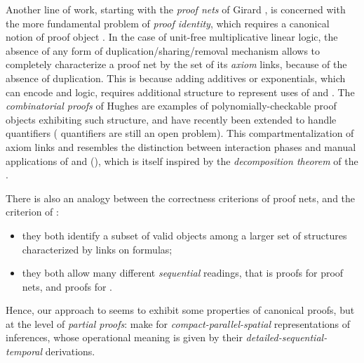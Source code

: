 \begin{scope}
Another line of work, starting with the \emph{proof nets} of Girard
, is concerned with the more fundamental problem of
\emph{proof identity}, which requires a canonical notion of proof object
. In the case of unit-free multiplicative
linear logic, the absence of any form of duplication/sharing/removal mechanism
allows to completely characterize a proof net by the set of its \emph{axiom}
links,
because of the absence of duplication. This is because adding additives or
exponentials, which can encode  and  logic, requires
additional structure to represent uses of  and . The
\emph{combinatorial proofs} of Hughes
 are examples of
polynomially-checkable proof objects exhibiting such structure, and have
recently been extended to handle   quantifiers
 ( quantifiers are still an open
problem). This compartmentalization of axiom links and 
resembles the distinction between interaction phases and manual applications of
{} and {} (), which is itself inspired by
the \emph{decomposition theorem} of the 
.

There is also an analogy between the correctness criterions of proof nets, and
the  criterion of :
\begin{itemize}
  \item they both identify a subset of valid objects among a larger set of
  structures characterized by links on formulas;
  \item they both allow many different \emph{sequential} readings, that is
   proofs for proof nets, and  proofs for
  .
\end{itemize}
Hence, our approach to  seems to exhibit some properties of
canonical proofs, but at the level of \emph{partial proofs}:   make
for \emph{compact-parallel-spatial} representations of inferences, whose
operational meaning is given by their \emph{detailed-sequential-temporal} 
derivations.



\end{scope}
